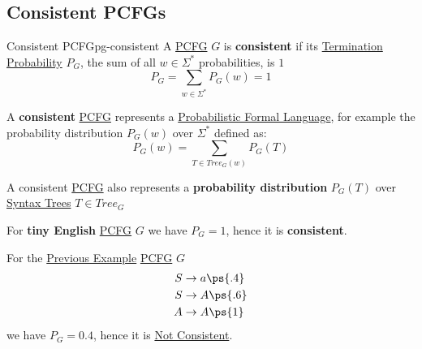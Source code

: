 \subsection{Consistent PCFGs}\label{sub:lm_consistent_pcfgs} %
\begin{definition}{Consistent PCFG}{pg-consistent}
    A \hyperref[def:pcfg]{PCFG} $G$ is \textbf{consistent} if its \hyperref[sub:lm_pcfg_termination_probability]{Termination Probability} $P_G$, the sum of all $w\in \Sigma^*$ probabilities, is $1$
    \[
        P_G = \sum_{w\in\Sigma^*}P_G(w) = 1
    \]
\end{definition}
A \textbf{consistent} \hyperref[def:pcfg]{PCFG} represents a \hyperref[def:pfl]{Probabilistic Formal Language}, for example the probability distribution $P_G(w)$ over $\Sigma^*$ defined as:
\[
    P_G(w) = \sum_{T\in Tree_G(w)}P_G(T)
\]
\begin{note}
    A consistent \hyperref[def:pcfg]{PCFG} also represents a \textbf{probability distribution} $P_G(T)$ over \hyperref[def:pg-syntax-tree]{Syntax Trees} $T\in Tree_G$
\end{note}
\begin{example}{}{}
    For \textbf{tiny English} \hyperref[def:pcfg]{PCFG} $G$ we have $P_G = 1$, hence it is \textbf{consistent}.
\end{example}
\begin{example}{}{}
    For the \hyperref[ex:pfl-1]{Previous Example} \hyperref[def:pcfg]{PCFG} $G$
    \[
        \begin{aligned}
            S&\to a \ps{.4} \\
            S&\to A \ps{.6} \\
            A&\to A \ps{1}
        \end{aligned}
    \]
    we have $P_G = 0.4$, hence it is \hyperref[def:pg-consistent]{Not Consistent}.
\end{example}
%
